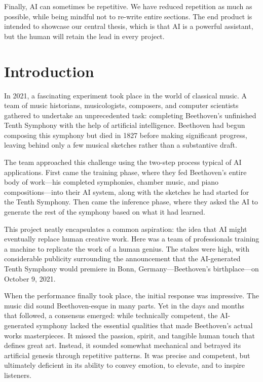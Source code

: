 \documentclass[
  Letterpaper,
]{scrbook}
\begin{document}
Finally, AI can sometimes be repetitive. We have reduced repetition as
much as possible, while being mindful not to re-write entire sections.
The end product is intended to showcase our central thesis, which is
that AI is a powerful assistant, but the human will retain the lead in
every project.


\chapter*{Introduction}\label{introduction}


In 2021, a fascinating experiment took place in the world of classical
music. A team of music historians, musicologists, composers, and
computer scientists gathered to undertake an unprecedented task:
completing Beethoven's unfinished Tenth Symphony with
the help of artificial
intelligence. Beethoven had
begun composing this symphony but died in 1827 before making significant
progress, leaving behind only a few musical sketches rather than a
substantive draft.

The team approached this challenge using the two-step process typical of
AI applications. First came the training phase, where they fed
Beethoven's entire body of work---his completed symphonies, chamber
music, and piano compositions---into their AI system, along with the
sketches he had started for the Tenth Symphony. Then came the inference
phase, where they asked the AI to generate the rest of the symphony
based on what it had learned.

This project neatly encapsulates a common aspiration: the idea that AI
might eventually replace human creative work. Here was a team of
professionals training a machine to replicate the work of a human
genius. The stakes were high, with considerable publicity surrounding
the announcement that the AI-generated Tenth Symphony would premiere in
Bonn, Germany---Beethoven's birthplace---on October 9, 2021.

When the performance finally took place, the initial response was
impressive. The music did sound Beethoven-esque in many parts. Yet in
the days and months that followed, a consensus emerged: while
technically competent, the AI-generated symphony lacked the essential
qualities that made Beethoven's actual works masterpieces. It missed the
passion, spirit, and tangible human touch that defines great art.
Instead, it sounded somewhat mechanical and betrayed its artificial
genesis through repetitive patterns. It was precise and competent, but
ultimately deficient in its ability to convey emotion, to elevate, and
to inspire listeners.
\end{document}
